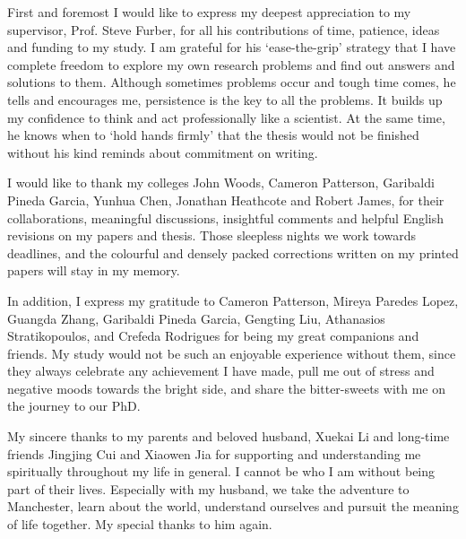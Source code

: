 First and foremost I would like to express my deepest appreciation to my supervisor, Prof. Steve Furber, for all his contributions of time, patience, ideas and funding to my study.
I am grateful for his `ease-the-grip' strategy that I have complete freedom to explore my own research problems and find out answers and solutions to them.
Although sometimes problems occur and tough time comes, he tells and encourages me, persistence is the key to all the problems.
It builds up my confidence to think and act professionally like a scientist.
At the same time, he knows when to `hold hands firmly' that the thesis would not be finished without his kind reminds about commitment on writing.

I would like to thank my colleges John Woods, Cameron Patterson, Garibaldi Pineda Garcia, Yunhua Chen, Jonathan Heathcote and Robert James, for their collaborations, meaningful discussions, insightful comments and helpful English revisions on my papers and thesis.
Those sleepless nights we work towards deadlines, and the colourful and densely packed corrections written on my printed papers will stay in my memory.

In addition, I express my gratitude to Cameron Patterson, Mireya Paredes Lopez, Guangda Zhang, Garibaldi Pineda Garcia, Gengting Liu, Athanasios Stratikopoulos, and Crefeda Rodrigues for being my great companions and friends.
My study would not be such an enjoyable experience without them, since they always celebrate any achievement I have made, pull me out of stress and negative moods towards the bright side, and share the bitter-sweets with me on the journey to our PhD.

My sincere thanks to my parents and beloved husband, Xuekai Li and long-time friends Jingjing Cui and Xiaowen Jia for supporting and understanding me spiritually throughout my life in general.
I cannot be who I am without being part of their lives.
Especially with my husband, we take the adventure to Manchester, learn about the world, understand ourselves and pursuit the meaning of life together.
My special thanks to him again. 
 
 	